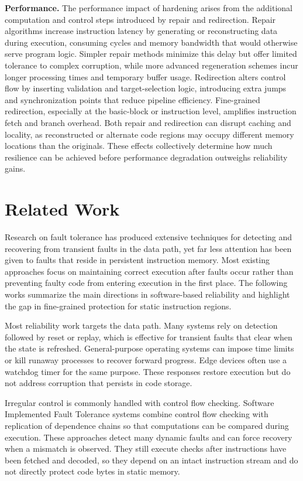 \textbf{Performance.}  
The performance impact of hardening arises from the additional computation and control steps introduced by repair and redirection. Repair algorithms increase instruction latency by generating or reconstructing data during execution, consuming cycles and memory bandwidth that would otherwise serve program logic. Simpler repair methods minimize this delay but offer limited tolerance to complex corruption, while more advanced regeneration schemes incur longer processing times and temporary buffer usage.  
Redirection alters control flow by inserting validation and target-selection logic, introducing extra jumps and synchronization points that reduce pipeline efficiency. Fine-grained redirection, especially at the basic-block or instruction level, amplifies instruction fetch and branch overhead. Both repair and redirection can disrupt caching and locality, as reconstructed or alternate code regions may occupy different memory locations than the originals. These effects collectively determine how much resilience can be achieved before performance degradation outweighs reliability gains.


\section{Related Work}

Research on fault tolerance has produced extensive techniques for detecting and recovering from transient faults in the data path, yet far less attention has been given to faults that reside in persistent instruction memory. Most existing approaches focus on maintaining correct execution after faults occur rather than preventing faulty code from entering execution in the first place. The following works summarize the main directions in software-based reliability and highlight the gap in fine-grained protection for static instruction regions.

Most reliability work targets the data path. Many systems rely on detection followed by reset or replay, which is effective for transient faults that clear when the state is refreshed. General-purpose operating systems can impose time limits or kill runaway processes to recover forward progress. Edge devices often use a watchdog timer for the same purpose. These responses restore execution but do not address corruption that persists in code storage.

Irregular control is commonly handled with control flow checking. Software Implemented Fault Tolerance systems combine control flow checking with replication of dependence chains so that computations can be compared during execution. These approaches detect many dynamic faults and can force recovery when a mismatch is observed. They still execute checks after instructions have been fetched and decoded, so they depend on an intact instruction stream and do not directly protect code bytes in static memory.

